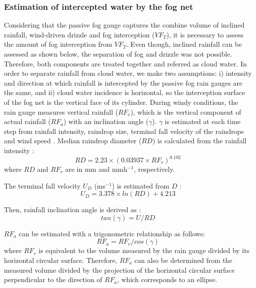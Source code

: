 \documentclass[a4paper,12pt]{article}
\begin{document}
\subsubsection{Estimation of intercepted water by the fog net}
Considering that the passive fog gauge captures the combine volume of inclined rainfall, wind-driven drizzle and fog interception ($VF_T$), it is necessary to assess the amount of fog interception from $VF_T$. Even though, inclined rainfall can be assessed as shown below, the separation of fog and drizzle was not possible. Therefore, both components are treated together and referred as cloud water. In order to separate rainfall from cloud water, we make two assumptions: i) intensity and direction at which rainfall is intercepted by the passive fog rain gauges are the same, and ii) cloud water incidence is horizontal, so the interception surface of the fog net is the vertical face of its cylinder. During windy conditions, the rain gauge measures vertical rainfall ($RF_v$), which is the vertical component of actual rainfall ($RF_a$) with an inclination angle ($\gamma$). $\gamma$ is estimated at each time step from rainfall intensity, raindrop size, terminal fall velocity of the raindrops and wind speed \citep{Holwerdaetal2006}. Median raindrop diameter ($RD$) is calculated from the rainfall intensity \citep{LawsandParsons1943, Holwerdaetal2006}:
 \begin{equation} \label{eq:fog_D}
    RD = 2.23 \times (0.03937 \times RF_v)^{0.102}
\end{equation}
where $RD$ and $RF_v$ are in mm and mmh$^{-1}$, respectively.

The terminal fall velocity $U_D$ (ms$^{-1}$) is estimated from $D$ \citep{GunnandKinzer1949, Holwerdaetal2006}:
\begin{equation} \label{eq:fog_UD}
    U_D = 3.378 \times ln(RD) + 4.213
\end{equation}

Then, rainfall inclination angle is derived as \citep{HerwitzandSlye1995, Holwerdaetal2006}:
\begin{equation} \label{eq:fog_gamma}
    tan(\gamma) = U/RD
\end{equation}

$RF_a$ can be estimated with a trigonometric relationship as follows:
 \begin{equation} \label{eq:fog_rain1}
    RF_a = RF_v/cos(\gamma)
\end{equation}
where $RF_v$ is equivalent to the volume measured by the rain gauge divided by its horizontal circular surface. Therefore, $RF_a$ can also be determined from the measured volume divided by the projection of the horizontal circular surface perpendicular to the direction of $RF_a$, which corresponds to an ellipse.
\end{document}

